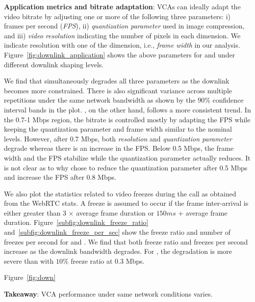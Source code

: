\textbf{Application metrics and bitrate adaptation}: VCAs can ideally adapt the video bitrate by adjusting one or more of the following three parameters: i) frames per second (\textit{FPS}), ii) \textit{quantization parameter} used in image compression, and  iii) \textit{video resolution} indicating the number of pixels in each dimension. We indicate resolution with one of the dimension, i.e., \textit{frame width} in our analysis. Figure~\ref{fig:downlink_application} shows the above parameters for \meet and \teamsbrowser under different downlink shaping levels. 



We find that \teamsbrowser simultaneously degrades all three parameters as the downlink becomes more constrained. There is also significant variance across multiple repetitions under the same network bandwidth as shown by the $90\%$ confidence interval bands in the plot. \meet, on the other hand, follows a more consistent trend. In the 0.7-1 Mbps region, the bitrate is controlled mostly by adapting the FPS while keeping the quantization parameter and frame width similar to the nominal levels. However, after 0.7 Mbps, both \textit{resolution} and \textit{quantization parameter} degrade whereas there is an increase in the FPS. Below 0.5 Mbps, the frame width and the FPS stabilize while the quantization parameter actually reduces. It is not clear as to why \meet chose to reduce the quantization parameter after 0.5 Mbps and increase the FPS after 0.8 Mbps. 

We also plot the statistics related to video freezes during the call as obtained from the WebRTC stats. A freeze is assumed to occur if the frame inter-arrival is either greater than 3 $\times$ average frame duration or $150 ms$ + average frame duration.  Figure~\ref{subfig:downlink_freeze_ratio} and~\ref{subfig:downlink_freeze_per_sec} show the freeze ratio and number of freezes per second for \meet and \teamsbrowser. We find that both freeze ratio and freezes per second increase as the downlink bandwidth degrades. For \meet, the degradation is more severe than \teamsbrowser with $10\%$ freeze ratio at 0.3 Mbps. 


Figure~\ref{fig:down}


\textbf{Takeaway}: VCA performance under same network conditions varies.  










